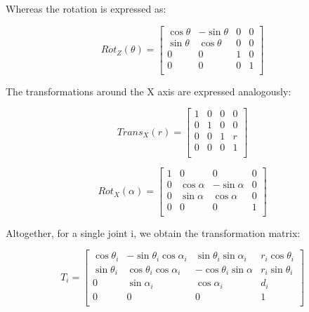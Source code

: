 Whereas the rotation is expressed as:

\begin{equation}
  Rot_Z(\theta) = \begin{bmatrix}
                    \cos{\theta} & -\sin{\theta} & 0 & 0 \\
                    \sin{\theta} & \cos{\theta} & 0 & 0 \\
                    0 & 0 & 1 & 0 \\ 0 & 0 & 0 & 1 \\
             \end{bmatrix}
\end{equation}

The transformations around the X axis are expressed analogously:

\begin{equation}
  Trans_X(r) = \begin{bmatrix}
                 1 & 0 & 0 & 0 \\ 0 & 1 & 0 & 0 \\ 0 & 0 & 1 & r \\ 0 & 0 & 0 & 1 \\
               \end{bmatrix}
\end{equation}


\begin{equation}
  Rot_X(\alpha) = \begin{bmatrix}
                    1 & 0 & 0 & 0 \\
                    0 & \cos{\alpha} & -\sin{\alpha} & 0 \\
                    0 & \sin{\alpha} & \cos{\alpha} & 0 \\
                    0 & 0 & 0 & 1 \\
             \end{bmatrix}
\end{equation}

Altogether, for a single joint i, we obtain the transformation matrix:

\begin{equation}
  T_i = \begin{bmatrix}
          \cos{\theta_i} & -\sin{\theta_i}\cos{\alpha_i} & \sin{\theta_i}\sin{\alpha_i} & r_i\cos{\theta_i} \\
          \sin{\theta_i} & \cos{\theta_i}\cos{\alpha_i} & -\cos{\theta_i}\sin{\alpha} & r_i\sin{\theta_i} \\
          0 & \sin{\alpha_i} & \cos{\alpha_i} & d_i \\
          0 & 0 & 0 & 1 \\
        \end{bmatrix}
\end{equation}


